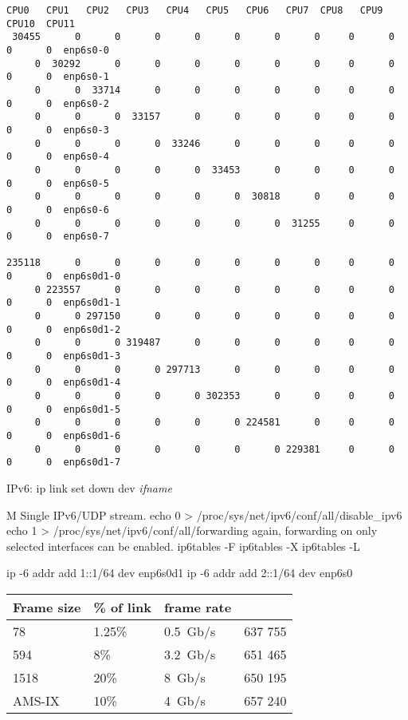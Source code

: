 \begin{lstlisting}[basicstyle=\tiny]
  CPU0   CPU1   CPU2   CPU3   CPU4   CPU5   CPU6   CPU7  CPU8   CPU9   CPU10  CPU11
 30455      0      0      0      0      0      0      0     0      0      0      0  enp6s0-0
     0  30292      0      0      0      0      0      0     0      0      0      0  enp6s0-1
     0      0  33714      0      0      0      0      0     0      0      0      0  enp6s0-2
     0      0      0  33157      0      0      0      0     0      0      0      0  enp6s0-3
     0      0      0      0  33246      0      0      0     0      0      0      0  enp6s0-4
     0      0      0      0      0  33453      0      0     0      0      0      0  enp6s0-5
     0      0      0      0      0      0  30818      0     0      0      0      0  enp6s0-6
     0      0      0      0      0      0      0  31255     0      0      0      0  enp6s0-7

235118      0      0      0      0      0      0      0     0      0      0      0  enp6s0d1-0
     0 223557      0      0      0      0      0      0     0      0      0      0  enp6s0d1-1
     0      0 297150      0      0      0      0      0     0      0      0      0  enp6s0d1-2
     0      0      0 319487      0      0      0      0     0      0      0      0  enp6s0d1-3
     0      0      0      0 297713      0      0      0     0      0      0      0  enp6s0d1-4
     0      0      0      0      0 302353      0      0     0      0      0      0  enp6s0d1-5
     0      0      0      0      0      0 224581      0     0      0      0      0  enp6s0d1-6
     0      0      0      0      0      0      0 229381     0      0      0      0  enp6s0d1-7
\end{lstlisting}





\newpage



IPv6:
ip link set down dev {\it{ifname}}

M
Single IPv6/UDP stream.
echo 0 > /proc/sys/net/ipv6/conf/all/disable\_ipv6
echo 1 > /proc/sys/net/ipv6/conf/all/forwarding
again, forwarding on only selected interfaces can be enabled.
ip6tables -F
ip6tables -X
ip6tables -L

ip -6 addr add 1::1/64 dev enp6s0d1
ip -6 addr add 2::1/64 dev enp6s0

\begin{tabular}{ | l | l | l | l | }
\hline
Frame size & \% of link & frame rate \\
\hline
78     & 1.25\% & 0.5~Gb/s & 637 755 \\ %
594    & 8\%    & 3.2~Gb/s & 651 465 \\ %
1518   & 20\%   & 8~Gb/s   & 650 195 \\ %
AMS-IX & 10\%   & 4~Gb/s   & 657 240 \\ %
\hline
\end{tabular}


